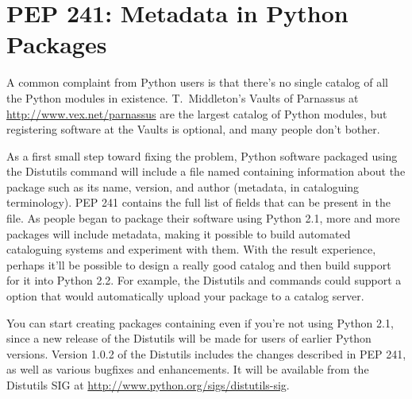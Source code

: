 \documentclass{howto}
\begin{document}
\begin{seealso}


\end{seealso}

\section{PEP 241: Metadata in Python Packages}

A common complaint from Python users is that there's no single catalog
of all the Python modules in existence.  T.~Middleton's Vaults of
Parnassus at \url{http://www.vex.net/parnassus} are the largest
catalog of Python modules, but registering software at the Vaults is
optional, and many people don't bother.

As a first small step toward fixing the problem, Python software
packaged using the Distutils  command will include a
file named  containing information about the package
such as its name, version, and author (metadata, in cataloguing
terminology).  PEP 241 contains the full list of fields that can be
present in the  file.  As people began to package their
software using Python 2.1, more and more packages will include
metadata, making it possible to build automated cataloguing systems
and experiment with them.  With the result experience, perhaps it'll
be possible to design a really good catalog and then build support for
it into Python 2.2.  For example, the Distutils 
and  commands could support a  option
that would automatically upload your package to a catalog server. 

You can start creating packages containing  even if
you're not using Python 2.1, since a new release of the Distutils will
be made for users of earlier Python versions.  Version 1.0.2 of the
Distutils includes the changes described in PEP 241, as well as
various bugfixes and enhancements.  It will be available from 
the Distutils SIG at \url{http://www.python.org/sigs/distutils-sig}.


\begin{seealso}



\end{seealso}
\end{document}
